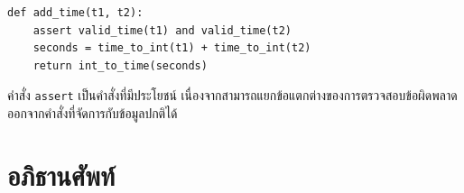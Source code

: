 \begin{verbatim}
def add_time(t1, t2):
    assert valid_time(t1) and valid_time(t2)
    seconds = time_to_int(t1) + time_to_int(t2)
    return int_to_time(seconds)
\end{verbatim}
%

คำสั่ง {\tt assert} เป็นคำสั่งที่มีประโยชน์ เนื่องจากสามารถแยกข้อแตกต่างของการตรวจสอบข้อผิดพลาดออกจากคำสั่งที่จัดการกับข้อมูลปกติได้

\section{อภิธานศัพท์}

